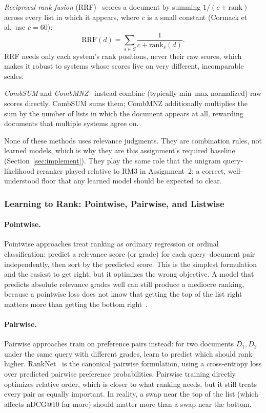 \documentclass[10pt]{article}
\begin{document}
\emph{Reciprocal rank fusion} (RRF)~\cite{cormack2009} scores a document by summing \(1/(c + \mathrm{rank})\) across every list in which it appears, where \(c\) is a small constant (Cormack et al.\ use \(c = 60\)):
\[
\mathrm{RRF}(d) = \sum_{s \in S} \frac{1}{c + \mathrm{rank}_s(d)}.
\]
RRF needs only each system's rank positions, never their raw scores, which makes it robust to systems whose scores live on very different, incomparable scales.

\emph{CombSUM} and \emph{CombMNZ}~\cite{foxshaw1994} instead combine (typically min--max normalized) raw scores directly. CombSUM sums them; CombMNZ additionally multiplies the sum by the number of lists in which the document appears at all, rewarding documents that multiple systems agree on.

None of these methods uses relevance judgments. They are combination rules, not learned models, which is why they are this assignment's required baseline (Section~\ref{sec:implement}). They play the same role that the unigram query-likelihood reranker played relative to RM3 in Assignment~2: a correct, well-understood floor that any learned model should be expected to clear.

\subsubsection{Learning to Rank: Pointwise, Pairwise, and Listwise}

\paragraph{Pointwise.}
Pointwise approaches treat ranking as ordinary regression or ordinal classification: predict a relevance score (or grade) for each query--document pair independently, then sort by the predicted score. This is the simplest formulation and the easiest to get right, but it optimizes the wrong objective. A model that predicts absolute relevance grades well can still produce a mediocre ranking, because a pointwise loss does not know that getting the top of the list right matters more than getting the bottom right~\cite[Ch.~3]{liu2009}.

\paragraph{Pairwise.}
Pairwise approaches train on preference pairs instead: for two documents \(D_1, D_2\) under the same query with different grades, learn to predict which should rank higher. RankNet~\cite{burges2005} is the canonical pairwise formulation, using a cross-entropy loss over predicted pairwise preference probabilities. Pairwise training directly optimizes relative order, which is closer to what ranking needs, but it still treats every pair as equally important. In reality, a swap near the top of the list (which affects nDCG@10 far more) should matter more than a swap near the bottom.
\end{document}

